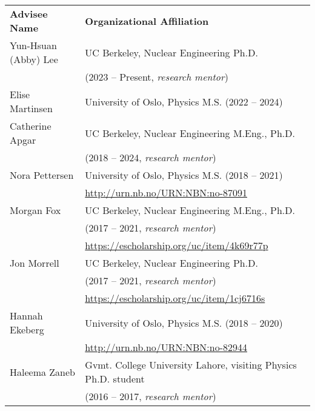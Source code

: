 \begin{longtable}{ @{} l @{\hspace{5ex}} l }
\bf{Advisee Name}   &  \bf{Organizational Affiliation}\\

Yun-Hsuan (Abby) Lee & UC Berkeley, Nuclear Engineering Ph.D. \\ & (2023 -- Present, \textit{research mentor})\\
Elise Martinsen & University of Oslo, Physics M.S. (2022 -- 2024)\\
Catherine  Apgar & UC Berkeley, Nuclear Engineering M.Eng., Ph.D. \\ & (2018 -- 2024, \textit{research mentor})\\
Nora Pettersen & University of Oslo, Physics M.S. (2018 -- 2021)\\
               & \url{http://urn.nb.no/URN:NBN:no-87091}\vspace{0.5mm}\\
Morgan  Fox & UC Berkeley, Nuclear Engineering M.Eng., Ph.D. \\ & (2017 -- 2021, \textit{research mentor})\\
                & \url{https://escholarship.org/uc/item/4k69r77p}\vspace{0.5mm}\\               
Jon  Morrell & UC Berkeley, Nuclear Engineering Ph.D. \\ & (2017 -- 2021, \textit{research mentor})\\
                & \url{https://escholarship.org/uc/item/1cj6716s}\vspace{0.5mm}\\
Hannah Ekeberg & University of Oslo, Physics M.S. (2018 -- 2020)\\
               & \url{http://urn.nb.no/URN:NBN:no-82944}\vspace{0.5mm}\\
Haleema Zaneb  & Gvmt. College University Lahore,
visiting Physics Ph.D. student\\
               &(2016 -- 2017, \textit{research mentor}) \\

\end{longtable}
